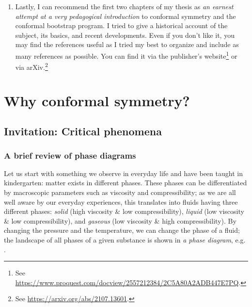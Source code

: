 \documentclass[12pt]{article}
\numberwithin{equation}{section}
\begin{document}
\begin{enumerate}
	\item Lastly, I can recommend the first two chapters of my thesis as \emph{an earnest attempt at a very pedagogical introduction} to conformal symmetry and the conformal bootstrap program. I tried to give a historical account of the subject, its basics, and recent developments. Even if you don't like it, you may find the references useful as I tried my best to organize and include as many references as possible. You can find it via the publisher's website\footnote{See \hyperref{https://www.proquest.com/docview/2557212384/2C5A80A2ADB447E7PQ}{}{}{https://www.proquest.com/docview/2557212384/2C5A80A2ADB447E7PQ}.} or via arXiv.\footnote{See \hyperref{https://arxiv.org/abs/2107.13601}{}{}{https://arxiv.org/abs/2107.13601}.}
\end{enumerate}


\clearpage
\listoffigures
{}%
\listoftables
{}%
\clearpage

\newpage


\section{Why conformal symmetry?}
\subsection{Invitation: Critical phenomena}
\subsubsection{A brief review of phase diagrams}
Let us start with something we observe in everyday life and have been taught in kindergarten: matter exists in different phases. These phases can be differentiated by macroscopic parameters such as  viscosity and compressibility; as we are all well aware by our everyday experiences, this translates into fluids having three different phases: \emph{solid} (high viscosity \& low compressibility), \emph{liquid} (low viscosity \& low compressibility), and \emph{gaseous} (low viscosity \& high compressibility). By changing the pressure and the temperature, we can change the phase of a fluid; the landscape of all phases of a given substance is shown in \emph{a phase diagram}, e.g. \figref{\ref{fig: phase diagram}}.
\end{document}
